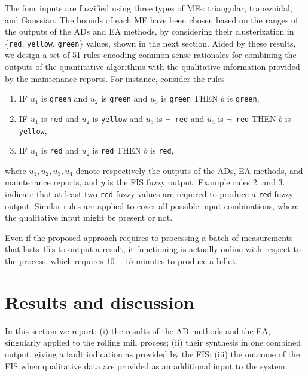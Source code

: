 The four inputs are fuzzified using three types of MFs: triangular, trapezoidal, and Gaussian. The bounds of each MF have been chosen based on the ranges of the outputs of the ADs and EA methods, by considering their clusterization in \{\texttt{red}, \texttt{yellow}, \texttt{green}\} values,  shown in the next section. Aided by these results, we design a set of 51 rules encoding common-sense rationales for combining the outputs of the quantitative algorithms with the qualitative information provided by the maintenance reports. For instance, consider the rules
\begin{enumerate}
\item IF $u_1$ is \texttt{green} and  $u_2$ is \texttt{green} and $u_3$ is \texttt{green} THEN  $b$ is \texttt{green},
%
\item IF $u_1$ is \texttt{red} and  $u_2$ is \texttt{yellow} and $u_3$ is $\neg \,$ \texttt{red} and $u_4$ is $\neg \,$ \texttt{red} THEN  $b$ is \texttt{yellow},
%
\item  IF $u_1$ is \texttt{red} and  $u_2$ is \texttt{red} THEN  $b$ is \texttt{red},
\end{enumerate}
where $u_1,u_2,u_3,u_4$  denote respectively the outputs of the ADs, EA methods, and maintenance reports, and $y$ is the FIS fuzzy output. Example rules 2. and 3. indicate that at least two \texttt{red} fuzzy values are required to produce a \texttt{red} fuzzy output. Similar rules are applied to cover all possible input combinations, where the qualitative input might be present or not. 


\begin{remark}
Even if the proposed approach requires to processing a batch of measurements that lasts $15\,\text{s}$ to output a result, it functioning is actually online with respect to the process, which requires $10-15$ minutes to produce a billet.
\end{remark}


\section{Results and discussion} \label{sec:simulations}
In this section we report: (i) the results of the AD methods and the EA, singularly applied to the rolling mill process; (ii) their synthesis in one combined output, giving a fault indication as provided by the FIS; (iii) the outcome of the FIS when qualitative data are provided as an additional input to the system.






